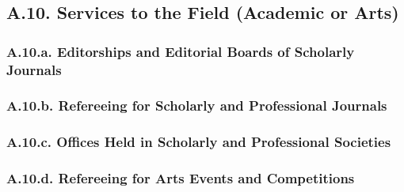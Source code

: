 \documentclass[12pt]{article}
\begin{document}

\subsection*{A.10. Services to the Field (Academic or Arts)}

\subsubsection*{A.10.a. Editorships and Editorial Boards of Scholarly Journals}


\subsubsection*{A.10.b. Refereeing for Scholarly and Professional Journals}

\subsubsection*{A.10.c. Offices Held in Scholarly and Professional Societies}

\subsubsection*{A.10.d. Refereeing for Arts Events and Competitions}
\end{document}

